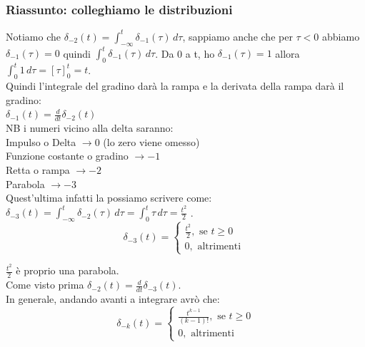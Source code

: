 \subsubsection{Riassunto: colleghiamo le distribuzioni}

	Notiamo che $ \delta_{-2}(t) = \int_{ -\infty}^{t} \delta_{-1}(\tau)  \, d \tau  $, sappiamo anche che per $ \tau <0 $ abbiamo $ \delta_{-1}(\tau) = 0 $ quindi $ \int_{ 0}^{t} \delta_{-1}(\tau)  \, d \tau $. Da 0 a t, ho $ \delta_{-1}(\tau) = 1 $ allora $ \int_{ 0}^{t} 1  \, d \tau = [ \tau]_0^t  = t $. \\
	Quindi l'integrale del gradino darà la rampa e la derivata della rampa darà il gradino:\\
	$ \delta_{-1}(t) =   \frac{d }{dt}\delta_{-2}(t)  $\\
	
	NB i numeri vicino alla delta saranno:\\
	Impulso o Delta $ \rightarrow 0 $ (lo zero viene omesso)\\
	Funzione costante o gradino $\rightarrow -1 $\\
	Retta o rampa $ \rightarrow -2 $\\
	Parabola $ \rightarrow -3 $\\
	Quest'ultima infatti la possiamo scrivere come:\\
	$ \delta_{-3}(t) = \int_{ -\infty}^{t} \delta_{-2}(\tau) \, d \tau = \int_{ 0}^{t} \tau \, d \tau = \frac{t^2}{2}$ .\\
	
	\begin{equation*}
	\delta_{-3}(t)=
	\begin{cases} 
	\frac{t^2}{2}, \mbox{ se } t \geq 0\\ 
	0, \mbox{ altrimenti }
	\end{cases} 
	\end{equation*}
	
	$ \frac{t^2}{2} $ è proprio una parabola.\\
	Come visto prima $ \delta_{-2}(t) = \frac{d }{dt}\delta_{-3}(t) $.\\
	
	In generale, andando avanti a integrare avrò che:\\
	
	\begin{equation*}
	\delta_{-k}(t)=
	\begin{cases} 
	\frac{t^{k-1}}{ (k-1)! }, \mbox{ se } t \geq 0\\ 
	0, \mbox{ altrimenti }
	\end{cases} 
	\end{equation*}
	
